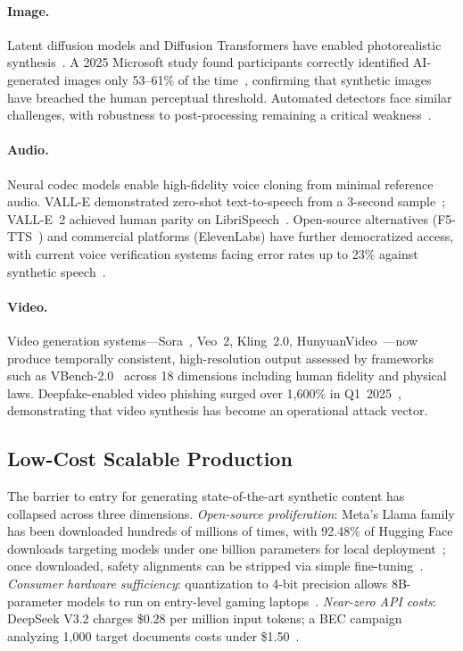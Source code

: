 \paragraph{Image.}
Latent diffusion models and Diffusion Transformers have enabled photorealistic synthesis~\cite{rombach2022ldm}. A 2025 Microsoft study found participants correctly identified AI-generated images only 53--61\% of the time~\cite{microsoft2025human}, confirming that synthetic images have breached the human perceptual threshold. Automated detectors face similar challenges, with robustness to post-processing remaining a critical weakness~\cite{aisafetyreport2026}.

\paragraph{Audio.}
Neural codec models enable high-fidelity voice cloning from minimal reference audio. VALL-E demonstrated zero-shot text-to-speech from a 3-second sample~\cite{wang2023valle}; VALL-E~2 achieved human parity on LibriSpeech~\cite{chen2024valle2}. Open-source alternatives (F5-TTS~\cite{chen2024f5tts}) and commercial platforms (ElevenLabs) have further democratized access, with current voice verification systems facing error rates up to 23\% against synthetic speech~\cite{aisafetyreport2025}.

\paragraph{Video.}
Video generation systems---Sora~\cite{brooks2024sora}, Veo~2, Kling~2.0, HunyuanVideo~\cite{kong2024hunyuan}---now produce temporally consistent, high-resolution output assessed by frameworks such as VBench-2.0~\cite{vbench2025} across 18 dimensions including human fidelity and physical laws. Deepfake-enabled video phishing surged over 1,600\% in Q1~2025~\cite{vectra2025whaling}, demonstrating that video synthesis has become an operational attack vector.


\subsection{Low-Cost Scalable Production}
\label{sec:cap-scale}

The barrier to entry for generating state-of-the-art synthetic content has collapsed across three dimensions. \emph{Open-source proliferation}: Meta's Llama family has been downloaded hundreds of millions of times, with 92.48\% of Hugging Face downloads targeting models under one billion parameters for local deployment~\cite{llama3,hfstats2025}; once downloaded, safety alignments can be stripped via simple fine-tuning~\cite{aisafetyreport2025}. \emph{Consumer hardware sufficiency}: quantization to 4-bit precision allows 8B-parameter models to run on entry-level gaming laptops~\cite{localai2026}. \emph{Near-zero API costs}: DeepSeek V3.2 charges \$0.28 per million input tokens; a BEC campaign analyzing 1,000 target documents costs under \$1.50~\cite{tldl2026pricing}.


